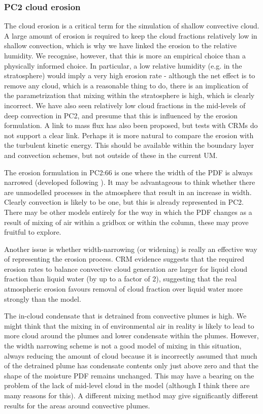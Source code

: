 \documentclass{UMDP_article}
\begin{document}
\subsubsection{PC2 cloud erosion}
The cloud erosion is a critical term for the simulation of shallow convective
cloud. A large amount of erosion is required to keep the cloud fractions relatively
low in shallow convection, which is why we have linked the erosion to the relative
humidity. We recognise, however, that this is more an empirical choice than a
physically informed choice. In particular, a low relative humidity (e.g. in the
stratosphere) would imply a very high erosion rate - although the net effect
is to remove any cloud, which is a reasonable thing to do, there is an implication of
the parametrization that mixing within the stratosphere is high, which is
clearly incorrect. We have also seen relatively low cloud fractions in the
mid-levels of deep convection in PC2, and presume that this is influenced
by the erosion formulation. A link to mass flux has also been proposed, but tests
with CRMs do not support a clear link. Perhaps it is more natural to compare the
erosion with the turbulent kinetic energy. This should be available within the
boundary layer and convection schemes, but not outside of these in the current
UM.

The erosion formulation in PC2:66 is one where the width of the PDF is
always narrowed (developed following \cite{sg03}).
It may be advantageous to think whether there are unmodelled
processes in the atmosphere that result in an increase in width. Clearly
convection is likely to be one, but this is already represented in PC2.
There may be other models entirely for the way in which the PDF changes as a result
of mixing of air within a gridbox or within the column, these may prove
fruitful to explore.

Another issue is whether width-narrowing (or widening) is really an effective
way of representing the erosion process. CRM evidence suggests that the required
erosion rates to balance convective cloud generation are larger for
liquid cloud fraction than liquid water (by up to a factor of 2), suggesting
that the real atmospheric erosion favours removal of cloud fraction
over liquid water more strongly than the model.

The in-cloud condensate that is detrained from convective plumes is high.
We might think that the mixing in of environmental air in reality is
likely to lead to more cloud around the plumes and lower condensate within
the plumes. However, the width narrowing scheme is not a good model of mixing
in this situation, always reducing the amount of cloud because it is incorrectly
assumed that much of the detrained plume has condensate contents only just above zero
and that the shape of the moisture PDF remains unchanged. This may have a
bearing on the problem of the lack of mid-level cloud in the model (although I
think there are many reasons for this). A different
mixing method may give significantly different results for the areas around
convective plumes.
\end{document}
